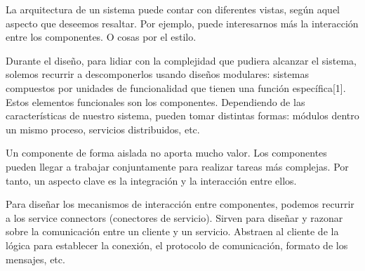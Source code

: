 La arquitectura de un sistema puede contar con diferentes vistas, según aquel aspecto que deseemos resaltar. Por ejemplo, puede interesarnos más la interacción entre los componentes. O cosas por el estilo.

Durante el diseño, para lidiar con la complejidad que pudiera alcanzar el sistema, solemos recurrir a descomponerlos usando diseños modulares: sistemas compuestos por unidades de funcionalidad que tienen una función específica[1]. Estos elementos funcionales son los componentes. Dependiendo de las características de nuestro sistema, pueden tomar distintas formas: módulos dentro un mismo proceso, servicios distribuidos, etc.

Un componente de forma aislada no aporta mucho valor. Los componentes pueden llegar a trabajar conjuntamente para realizar tareas más complejas. Por tanto, un aspecto clave es la integración y la interacción entre ellos. \cite{mehtaTaxonomySoftwareConnectors2000}

Para diseñar los mecanismos de interacción entre componentes, podemos recurrir a los service connectors (conectores de servicio). Sirven para diseñar y razonar sobre la comunicación entre un cliente y un servicio. Abstraen al cliente de la lógica para establecer la conexión, el protocolo de comunicación, formato de los mensajes, etc. 